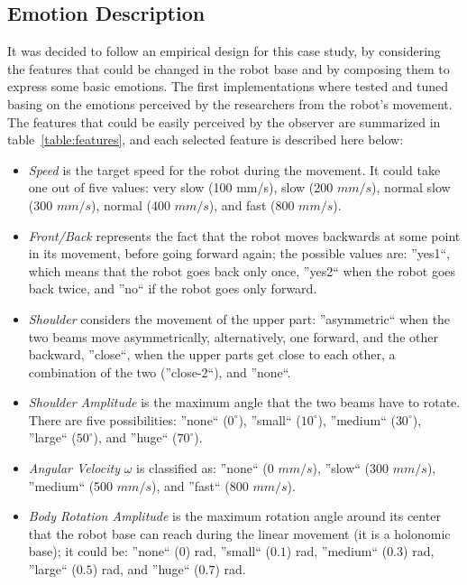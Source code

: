 
\subsection{Emotion Description}

It was decided to follow an empirical design for this case study, by considering the features that could be changed in the robot base and by composing them to express some basic emotions. The first implementations where tested and tuned basing on the emotions perceived by the researchers from the robot's movement. The features that could be easily perceived by the observer are summarized in table~\ref{table:features}, and each selected feature is described here below:

\begin{itemize}

	\item \textit{Speed} is the target speed for the robot during the movement. It could take one out of five values: very slow (100 mm/s), slow (200 $mm/s$), normal slow (300 $mm/s$), normal (400 $mm/s$), and fast (800 $mm/s$).

	\item \textit{Front/Back} represents the fact that the robot moves backwards at some point in its movement, before going forward again; the possible values are: ''yes1``, which means that the robot goes back only once, ''yes2`` when the robot goes back twice, and ''no`` if the robot goes only forward.

	\item \textit{Shoulder} considers the movement of the upper part: ''asymmetric`` when the two beams move asymmetrically, alternatively, one forward, and the other backward, ''close``, when the upper parts get close to each other, a combination of the two (''close-2``), and ''none``. 

	\item \textit{Shoulder Amplitude} is the maximum angle that the two beams have to rotate. There are five possibilities: ''none`` ($0^\circ$), ''small`` ($10^\circ$), ''medium`` ($30^\circ$), ''large`` ($50^\circ$), and ''huge`` ($70^\circ$).

	\item \textit{Angular Velocity} $\omega$ is classified as: ''none`` (0 $mm/s$), ''slow`` (300 $mm/s$), ''medium`` (500 $mm/s$), and ''fast`` (800 $mm/s$).

	\item \textit{Body Rotation Amplitude} is the maximum  rotation angle around its center that the robot base can reach during the linear movement (it is a holonomic base); it could be: ''none`` ($0$) rad, ''small`` ($0.1$) rad, ''medium`` ($0.3$) rad, ''large`` ($0.5$) rad, and ''huge`` ($0.7$) rad.
\end{itemize}

